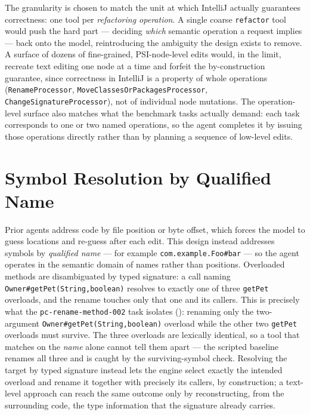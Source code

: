 The granularity is chosen to match the unit at which IntelliJ actually guarantees
correctness: one tool per \emph{refactoring operation}. A single coarse
\texttt{refactor} tool would push the hard part --- deciding \emph{which} semantic
operation a request implies --- back onto the model, reintroducing the ambiguity the
design exists to remove. A surface of dozens of fine-grained, PSI-node-level edits
would, in the limit, recreate text editing one node at a time and forfeit the
by-construction guarantee, since correctness in IntelliJ is a property of whole
operations (\texttt{RenameProcessor}, \texttt{MoveClassesOrPackagesProcessor},
\texttt{ChangeSignatureProcessor}), not of individual node mutations. The
operation-level surface also matches what the benchmark tasks actually demand: each
task corresponds to one or two named operations, so the agent completes it by issuing
those operations directly rather than by planning a sequence of low-level edits.

\section{Symbol Resolution by Qualified Name}
\label{sec:design-symbols}

Prior agents address code by file position or byte offset, which forces the model
to guess locations and re-guess after each edit. This design instead addresses
symbols by \emph{qualified name} --- for example \texttt{com.example.Foo\#bar} ---
so the agent operates in the semantic domain of names rather than positions.
Overloaded methods are disambiguated by typed signature: a call naming
\texttt{Owner\#getPet(String,boolean)} resolves to exactly one of three
\texttt{getPet} overloads, and the rename touches only that one and its callers.
This is precisely what the \texttt{pc-rename-method-002} task isolates
(): renaming only the two-argument
\texttt{Owner\#getPet(String,boolean)} overload while the other two \texttt{getPet}
overloads must survive. The three overloads are lexically identical, so a tool that
matches on the \emph{name} alone cannot tell them apart --- the scripted baseline
renames all three and is caught by the surviving-symbol check. Resolving the target by
typed signature instead lets the engine select exactly the intended overload and
rename it together with precisely its callers, by construction; a text-level approach
can reach the same outcome only by reconstructing, from the surrounding code, the
type information that the signature already carries.

